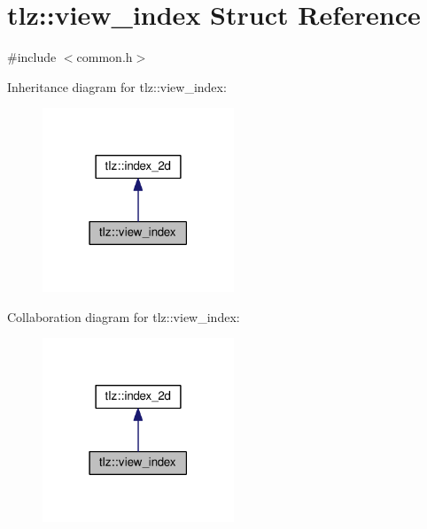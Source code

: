 \hypertarget{structtlz_1_1view__index}{}\section{tlz\+:\+:view\+\_\+index Struct Reference}
\label{structtlz_1_1view__index}


{\ttfamily \#include $<$common.\+h$>$}



Inheritance diagram for tlz\+:\+:view\+\_\+index\+:
\nopagebreak
\begin{figure}[H]
\begin{center}
\leavevmode
\includegraphics[width=162pt]{structtlz_1_1view__index__inherit__graph}
\end{center}
\end{figure}


Collaboration diagram for tlz\+:\+:view\+\_\+index\+:
\nopagebreak
\begin{figure}[H]
\begin{center}
\leavevmode
\includegraphics[width=162pt]{structtlz_1_1view__index__coll__graph}
\end{center}
\end{figure}
